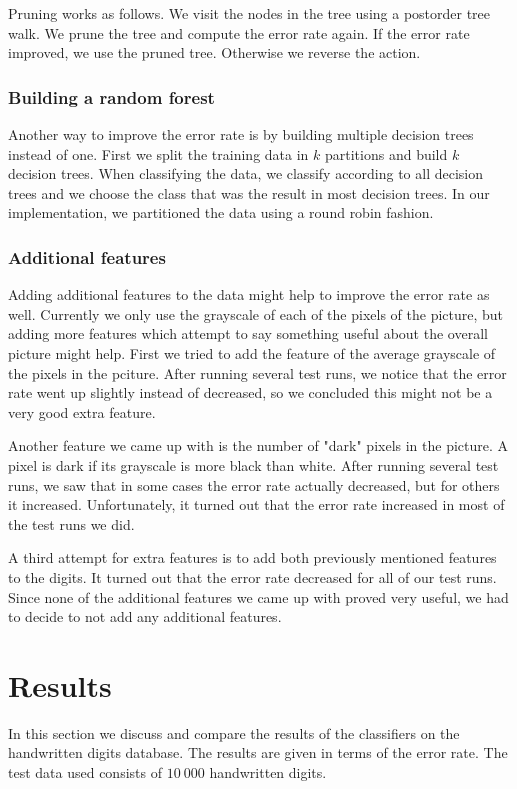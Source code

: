 \documentclass[10pt,a4paper]{article}
\begin{document}
Pruning works as follows. We visit the nodes in the tree using a postorder tree walk. We prune the tree and compute the error rate again. If the error rate improved, we use the pruned tree. Otherwise we reverse the action.
\subsubsection{Building a random forest}
Another way to improve the error rate is by building multiple decision trees instead of one. First we split the training data in $k$ partitions and build $k$ decision trees. When classifying the data, we classify according to all decision trees and we choose the class that was the result in most decision trees. In our implementation, we partitioned the data using a round robin fashion.

\subsubsection{Additional features}
Adding additional features to the data might help to improve the error rate as well. Currently we only use the grayscale of each of the pixels of the picture, but adding more features which attempt to say something useful about the overall picture might help. First we tried to add the feature of the average grayscale of the pixels in the pciture. After running several test runs, we notice that the error rate went up slightly instead of decreased, so we concluded this might not be a very good extra feature. 

Another feature we came up with is the number of "dark" pixels in the picture. A pixel is dark if its grayscale is more black than white. After running several test runs, we saw that in some cases the error rate actually decreased, but for others it increased. Unfortunately, it turned out that the error rate increased in most of the test runs we did. 

A third attempt for extra features is to add both previously mentioned features to the digits. It turned out that the error rate decreased for all of our test runs. Since none of the additional features we came up with proved very useful, we had to decide to not add any additional features.

\section{Results}
In this section we discuss and compare the results of the classifiers on the handwritten digits database. The results are given in terms of the error rate. The test data used consists of $10\ 000$ handwritten digits.
\end{document}
